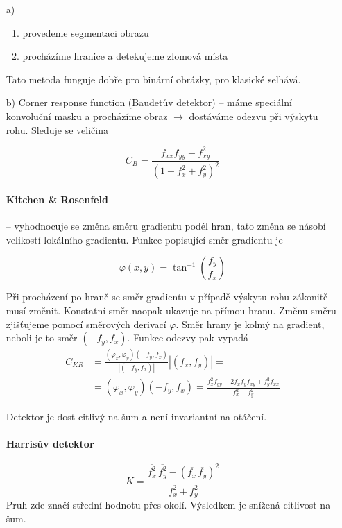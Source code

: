 \begin{itemize}
\item[a)]
\begin{enumerate}
\item provedeme segmentaci obrazu
\item procházíme hranice a detekujeme zlomová místa
\end{enumerate}
Tato metoda funguje dobře pro binární obrázky, pro klasické selhává.
\item[b)] Corner response function (Baudetův detektor) -- 
máme speciální konvoluční masku a procházíme obraz $\rightarrow$ 
dostáváme odezvu při výskytu rohu. Sleduje se veličina 

\begin{equation}
C_B=\frac{f_{xx}f_{yy}-f_{xy}^2}{(1+f_x^2+f_y^2)^2}
\end{equation}

\paragraph{Kitchen \& Rosenfeld} -- vyhodnocuje se změna směru gradientu podél hran, tato změna se násobí 
velikostí lokálního gradientu. Funkce popisující směr gradientu je

\begin{equation}
\varphi(x,y)=\tan^{-1}\left(\frac{f_y}{f_x}\right)
\end{equation}

Při procházení po hraně se směr gradientu v případě výskytu rohu zákonitě musí změnit. Konstatní směr naopak
ukazuje na přímou hranu. Změnu směru zjišťujeme pomocí směrových derivací $\varphi$. Směr hrany je kolmý na gradient,
neboli je to směr $(-f_y,f_x)$. Funkce odezvy pak vypadá
\begin{align}
C_{KR} &= \frac{(\varphi_x,\varphi_y)(-f_y,f_x)}{\left|(-f_y,f_x)\right|}\left|(f_x,f_y)\right|=\nonumber\\
 &= (\varphi_x,\varphi_y)(-f_y,f_x)=\frac{f^2_xf_{yy}-2f_xf_yf_{xy}+f_y^2f_{xx}}{f_x^2+f_y^2}
\end{align}

Detektor je dost citlivý na šum a není invariantní na otáčení.


\paragraph{Harrisův detektor}
\begin{equation}
K=\frac{\overline{f^2_x}\,\overline{f^2_y}-(\overline{f_x}\,\overline{f_y})^2}{\overline{f^2_x}+\overline{f^2_y}}
\end{equation}
Pruh zde značí střední hodnotu přes okolí. Výsledkem je snížená citlivost na šum.

\end{itemize}

